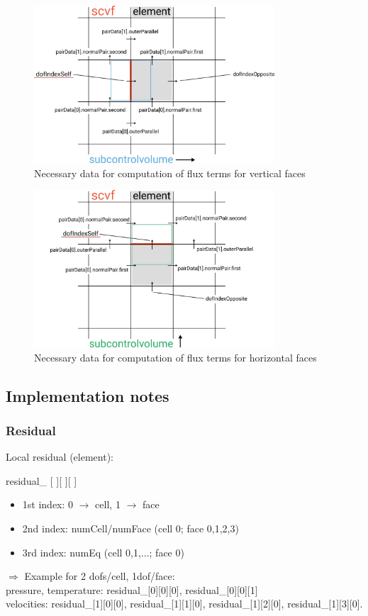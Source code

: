 \documentclass[a4paper,10pt]{scrartcl}
\begin{document}
\begin{figure}
 \centering
 \includegraphics[width=0.8\textwidth]{scheme_scv_horizontal.png}
 \caption{Necessary data for computation of flux terms for vertical faces}
 \label{fig:data_vertical_faces}
\end{figure}

\begin{figure}
 \centering
 \includegraphics[width=0.8\textwidth]{scheme_scv_vertical.png}
 \caption{Necessary data for computation of flux terms for horizontal faces}
 \label{fig:data_horizontal_faces}
 \end{figure}
 
 \subsection{Implementation notes}
 \subsubsection{Residual}
 Local residual (element):
 \begin{center} residual\_ [ ][ ][ ] \end{center}
 \begin{itemize}
  \item 1st index: 0 $\rightarrow$ cell, 1 $\rightarrow$ face
  \item 2nd index: numCell/numFace (cell 0; face 0,1,2,3)
  \item 3rd index: numEq (cell 0,1,...; face 0)
 \end{itemize}
 $\Rightarrow$ Example for 2 dofs/cell, 1dof/face: \\
 pressure, temperature: residual\_[0][0][0], residual\_[0][0][1] \\
 velocities: residual\_[1][0][0], residual\_[1][1][0], residual\_[1][2][0], residual\_[1][3][0]. \\
\end{document}
